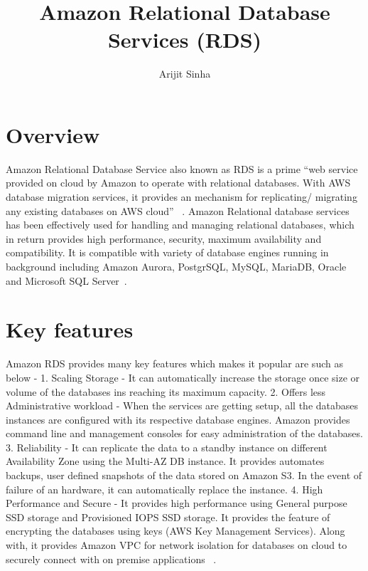 
\title{Amazon Relational Database Services (RDS)}


\author{Arijit Sinha}


\renewcommand{\shortauthors}{A.Sinha}


\maketitle

\section{Overview}

Amazon Relational Database Service also known as RDS is a prime ``web service 
provided on cloud by Amazon to operate with relational databases. 
With AWS database migration services, it provides an mechanism for 
replicating/ migrating any existing databases on AWS cloud''
~\cite{hid-sp18-520-amazonrds}.
Amazon Relational database services has been effectively used for  handling
and managing relational databases, which in return provides high performance, 
security, maximum availability and compatibility. 
It is compatible with variety of database engines running in background 
including Amazon Aurora, PostgrSQL, MySQL, MariaDB, Oracle and 
Microsoft SQL Server~\cite{hid-sp18-520-amazonrds}.

\section{Key features}

Amazon RDS provides many key features which makes it popular are such as below - 
1. Scaling Storage - It can automatically increase the storage once size or 
volume of the databases ins reaching its maximum capacity.
2. Offers less Administrative workload - When the services are getting setup, 
all the databases instances are configured with its respective database engines. 
Amazon provides command line and management consoles for easy administration 
of the databases.
3. Reliability - It can replicate the data to a standby instance on different 
Availability Zone using the Multi-AZ DB instance. It provides  automates 
backups, user defined snapshots of the data stored on Amazon S3. In the event 
of failure of an hardware, it can automatically replace the instance.
4. High Performance and Secure - It provides high performance using General 
purpose SSD storage and Provisioned IOPS SSD storage. It provides the feature 
of encrypting the databases using keys (AWS Key Management Services). 
Along with, it provides Amazon VPC for network isolation for databases on 
cloud to securely connect with on premise applications
~\cite{hid-sp18-520-amazonrds}.
 

